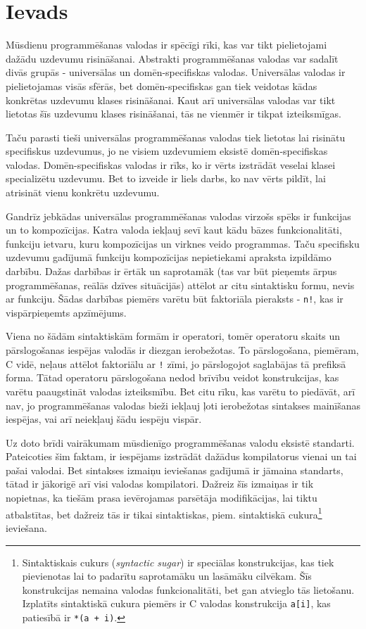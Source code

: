 \section{\label{s:motivation}Ievads}

Mūsdienu programmēšanas valodas ir spēcīgi rīki, kas var tikt pielietojami dažādu uzdevumu risināšanai. Abstrakti programmēšanas valodas var sadalīt divās grupās - universālas un domēn-specifiskas valodas. Universālas valodas ir pielietojamas visās sfērās, bet domēn-specifiskas gan tiek veidotas kādas konkrētas uzdevumu klases risināšanai. Kaut arī universālas valodas var tikt lietotas šīs uzdevumu klases risināšanai, tās ne vienmēr ir tikpat izteiksmīgas.

Taču parasti tieši universālas programmēšanas valodas tiek lietotas lai risinātu specifiskus uzdevumus, jo ne visiem uzdevumiem eksistē domēn-specifiskas valodas. Domēn-specifiskas valodas ir rīks, ko ir vērts izstrādāt veselai klasei specializētu uzdevumu. Bet to izveide ir liels darbs, ko nav vērts pildīt, lai atrisināt vienu konkrētu uzdevumu.

Gandrīz jebkādas universālas programmēšanas valodas virzošs spēks ir funkcijas un to kompozīcijas. Katra valoda iekļauj sevī kaut kādu bāzes funkcionalitāti, funkciju ietvaru, kuru kompozīcijas un virknes veido programmas. Taču specifisku uzdevumu gadījumā funkciju kompozīcijas nepietiekami apraksta izpildāmo darbību. Dažas darbības ir ērtāk un saprotamāk (tas var būt pieņemts ārpus programmēšanas, reālās dzīves situācijās) attēlot ar citu sintaktisku formu, nevis ar funkciju. Šādas darbības piemērs varētu būt faktoriāla pieraksts - \verb|n!|, kas ir vispārpieņemts apzīmējums.

Viena no šādām sintaktiskām formām ir operatori, tomēr operatoru skaits un pārslogošanas iespējas valodās ir diezgan ierobežotas. To pārslogošana, piemēram, C vidē, neļaus attēlot faktoriālu ar \verb|!| zīmi, jo pārslogojot saglabājas tā prefiksā forma. Tātad operatoru pārslogošana nedod brīvību veidot konstrukcijas, kas varētu paaugstināt valodas izteiksmību. Bet citu rīku, kas varētu to piedāvāt, arī nav, jo programmēšanas valodas bieži iekļauj ļoti ierobežotas sintakses mainīšanas iespējas, vai arī neiekļauj šādu iespēju vispār.

Uz doto brīdi vairākumam mūsdienīgo programmēšanas valodu eksistē standarti. Pateicoties šim faktam, ir iespējams izstrādāt dažādus kompilatorus vienai un tai pašai valodai. Bet sintakses izmaiņu ieviešanas gadījumā ir jāmaina standarts, tātad ir jākorigē arī visi valodas kompilatori. Dažreiz šīs izmaiņas ir tik nopietnas, ka tiešām prasa ievērojamas parsētāja modifikācijas, lai tiktu atbalstītas, bet dažreiz tās ir tikai sintaktiskas, piem. sintaktiskā cukura\footnote{Sintaktiskais cukurs (\emph{syntactic sugar}) ir speciālas konstrukcijas, kas tiek pievienotas lai to padarītu saprotamāku un lasāmāku cilvēkam. Šīs konstrukcijas nemaina valodas funkcionalitāti, bet gan atvieglo tās lietošanu. Izplatīts sintaktiskā cukura piemērs ir C valodas konstrukcija \texttt{a[i]}, kas patiesībā ir \texttt{*(a + i)}.} ieviešana.

